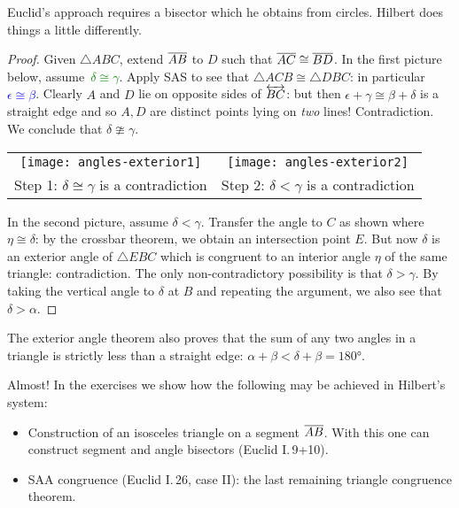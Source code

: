 
Euclid's approach requires a bisector which he obtains from circles. Hilbert does things a little differently.

\begin{proof}
Given $\triangle ABC$, extend $\overline{AB}$ to $D$ such that \textcolor{blue}{$\overline{AC}\cong\overline{BD}$}.\smallbreak
In the first picture below, assume\ \textcolor{Green}{$\delta\cong\gamma$}. Apply SAS to see that $\triangle ACB\cong\triangle DBC$: in particular \textcolor{blue}{$\epsilon\cong\beta$}.\smallbreak
Clearly $A$ and $D$ lie on opposite sides of $\overleftrightarrow{BC}$: but then $\epsilon+\gamma\cong \beta+\delta$ is a straight edge and so $A,D$ are distinct points lying on \emph{two} lines! Contradiction.\smallbreak
We conclude that $\delta\ncong\gamma$.
\begin{center}
\begin{tabular}{c@{\qquad}c}
\texttt{[image: angles-exterior1]}&\texttt{[image: angles-exterior2]}\\
Step 1: $\delta\cong\gamma$ is a contradiction&Step 2: $\delta<\gamma$ is a contradiction
\end{tabular}
\end{center}
In the second picture, assume $\delta<\gamma$. Transfer the angle to $C$ as shown where $\eta\cong\delta$: by the crossbar theorem, we obtain an intersection point $E$. But now $\delta$ is an exterior angle of $\triangle EBC$ which is congruent to an interior angle $\eta$ of the same triangle: contradiction.\smallbreak
The only non-contradictory possibility is that $\delta>\gamma$.\smallbreak
By taking the vertical angle to $\delta$ at $B$ and repeating the argument, we also see that $\delta>\alpha$.
\end{proof}

The exterior angle theorem also proves that the sum of any two angles in a triangle is strictly less than a straight edge: $\alpha+\beta<\delta+\beta =\ang{180}$.

\goodbreak


Almost! In the exercises we show how the following may be achieved in Hilbert's system:
\begin{itemize}
  \item Construction of an isosceles triangle on a segment $\overline{AB}$. With this one can construct segment and angle bisectors (Euclid I.\,9+10).
  \item SAA congruence (Euclid I.\,26, case II): the last remaining triangle congruence theorem.
\end{itemize}

